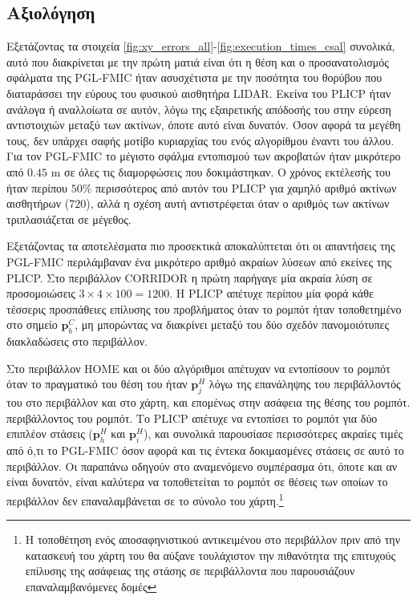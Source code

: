 \subsection{Αξιολόγηση}
\label{subsection:02_03_04:03}

Εξετάζοντας τα στοιχεία \ref{fig:xy_errors_all}-\ref{fig:execution_times_csal}
συνολικά, αυτό που διακρίνεται με την πρώτη ματιά είναι ότι η θέση και ο προσανατολισμός
σφάλματα της PGL-FMIC ήταν ασυσχέτιστα με την ποσότητα του θορύβου που διαταράσσει την
εύρους του φυσικού αισθητήρα LIDAR. Εκείνα του PLICP ήταν ανάλογα ή
αναλλοίωτα σε αυτόν, λόγω της εξαιρετικής απόδοσής του στην εύρεση αντιστοιχιών
μεταξύ των ακτίνων, όποτε αυτό είναι δυνατόν. Όσον αφορά τα μεγέθη τους, δεν υπάρχει σαφής
μοτίβο κυριαρχίας του ενός αλγορίθμου έναντι του άλλου. Για τον PGL-FMIC το μέγιστο
σφάλμα εντοπισμού των ακροβατών ήταν μικρότερο από $0.45$ m σε όλες τις διαμορφώσεις που δοκιμάστηκαν.
Ο χρόνος εκτέλεσής του ήταν περίπου $50\%$ περισσότερος από αυτόν του PLICP για χαμηλό
αριθμό ακτίνων αισθητήρων ($720$), αλλά η σχέση αυτή αντιστρέφεται όταν ο αριθμός των
ακτίνων τριπλασιάζεται σε μέγεθος.

Εξετάζοντας τα αποτελέσματα πιο προσεκτικά αποκαλύπτεται ότι οι απαντήσεις της PGL-FMIC περιλάμβαναν ένα
μικρότερο αριθμό ακραίων λύσεων από εκείνες της PLICP. Στο περιβάλλον CORRIDOR
η πρώτη παρήγαγε μία ακραία λύση σε προσομοιώσεις $3\times4\times100 = 1200$.
Η PLICP απέτυχε περίπου μία φορά κάθε τέσσερις προσπάθειες επίλυσης του προβλήματος όταν
το ρομπότ ήταν τοποθετημένο στο σημείο $\bm{p}_b^C$, μη μπορώντας να διακρίνει μεταξύ του
δύο σχεδόν πανομοιότυπες διακλαδώσεις στο περιβάλλον.

Στο περιβάλλον HOME και οι δύο αλγόριθμοι απέτυχαν να εντοπίσουν το ρομπότ όταν το πραγματικό του
θέση του ήταν $\bm{p}_j^H$ λόγω της επανάληψης του περιβάλλοντός του στο
περιβάλλον και στο χάρτη, και επομένως στην ασάφεια της θέσης του ρομπότ.
περιβάλλοντος του ρομπότ. Το PLICP απέτυχε να εντοπίσει το ρομπότ για δύο επιπλέον στάσεις
($\bm{p}_h^H$ και $\bm{p}_i^H$), και συνολικά παρουσίασε περισσότερες ακραίες τιμές από ό,τι το
PGL-FMIC όσον αφορά και τις έντεκα δοκιμασμένες στάσεις σε αυτό το περιβάλλον. Οι παραπάνω
οδηγούν στο αναμενόμενο συμπέρασμα ότι, όποτε και αν είναι δυνατόν, είναι
καλύτερα να τοποθετείται το ρομπότ σε θέσεις των οποίων το περιβάλλον δεν επαναλαμβάνεται σε
το σύνολο του χάρτη.\footnote{Η τοποθέτηση ενός αποσαφηνιστικού αντικειμένου στο
περιβάλλον πριν από την κατασκευή του χάρτη του θα αύξανε τουλάχιστον την πιθανότητα
της επιτυχούς επίλυσης της ασάφειας της στάσης σε περιβάλλοντα που παρουσιάζουν
επαναλαμβανόμενες δομές}

